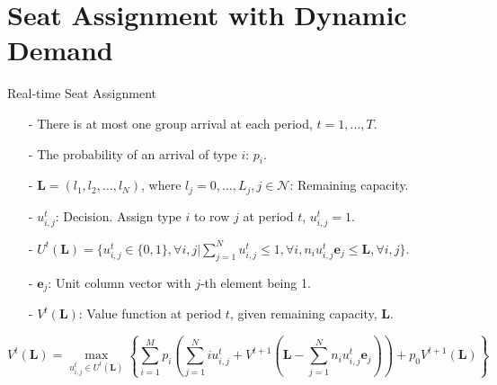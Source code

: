 
\section{Seat Assignment with Dynamic Demand}
    \frame{\sectionpage}

    \begin{frame}{Real-time Seat Assignment}
      \centering
      \small
      \begin{itemize}
      \item[-] There is at most one group arrival at each period, $t = 1, \ldots, T$. 
      \item[-] The probability of an arrival of type $i$: $p_i$.
      \item[-] $\mathbf{L} = (l_1, l_2, \ldots, l_{N})$, where $l_j =0,\ldots, L_j, j\in \mathcal{N}$: Remaining capacity.
      \item[-] $u_{i,j}^{t}$: Decision. Assign type $i$ to row $j$ at period $t$, $u_{i,j}^t =1$.
      \item[-] $U^{t}(\mathbf{L}) = \{u_{i,j}^{t} \in\{0,1\}, \forall i,j| \sum_{j=1}^{N} u_{i,j}^{t} \leq 1, \forall i, n_{i}u_{i,j}^{t}\mathbf{e}_j \leq \mathbf{L}, \forall i,j \}$.
      \item[-] $\mathbf{e}_j$: Unit column vector with $j$-th element being 1.
      \item[-] $V^{t}(\mathbf{L})$: Value function at period $t$, given remaining capacity, $\mathbf{L}$.
      \end{itemize}
  
      $$V^{t}(\mathbf{L}) = \max_{u_{i,j}^{t} \in U^{t}(\mathbf{L})}\left\{ \sum_{i=1}^{M} p_i ( \sum_{j=1}^{N} i u_{i,j}^{t} + V^{t+1}(\mathbf{L}- \sum_{j=1}^{N} n_i u_{i,j}^{t}\mathbf{e}_j)) + p_0 V^{t+1}(\mathbf{L})\right\}$$
      \small
  \end{frame}

